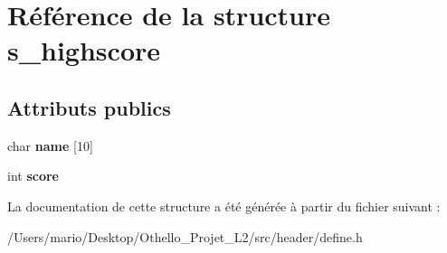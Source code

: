 \hypertarget{structs__highscore}{}\section{Référence de la structure s\+\_\+highscore}
\label{structs__highscore}
\subsection*{Attributs publics}
\begin{DoxyCompactItemize}
\item 
\mbox{\label{structs__highscore_a0577f01f8654dbab2cb515f8ab773113}} 
char {\bfseries name} \mbox{[}10\mbox{]}
\item 
\mbox{\label{structs__highscore_afb5916535325ddb8179817bdc916c4c0}} 
int {\bfseries score}
\end{DoxyCompactItemize}


La documentation de cette structure a été générée à partir du fichier suivant \+:\begin{DoxyCompactItemize}
\item 
/\+Users/mario/\+Desktop/\+Othello\+\_\+\+Projet\+\_\+\+L2/src/header/define.\+h\end{DoxyCompactItemize}
